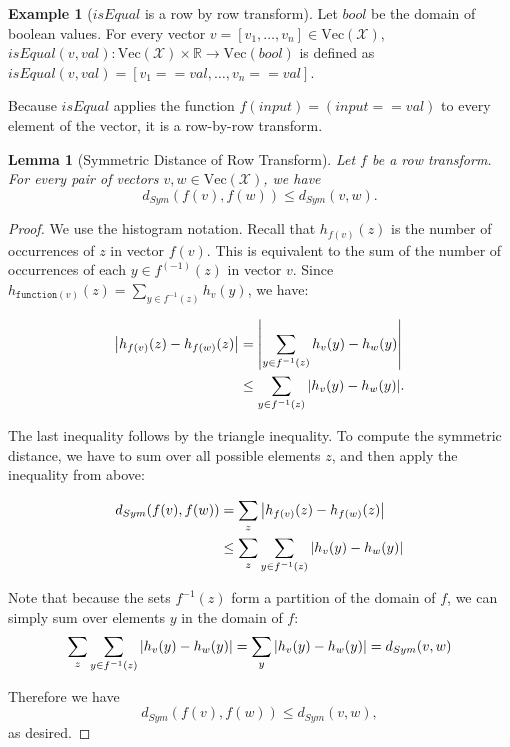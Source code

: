 \documentclass[11pt,a4paper]{article}
\newtheorem{lemma}[theorem]{Lemma}
\theoremstyle{definition}
\newtheorem{example}[theorem]{Example}
\newcommand{\Vect}{\mathrm{Vec}}
\begin{document}
\begin{example}[$isEqual$ is a row by row transform]
Let $bool$ be the domain of boolean values. For every vector $v = [v_1,\ldots,v_n]\in\Vect(\mathcal{X})$, $isEqual(v,val): \Vect(\mathcal{X})\times \mathbb{R} \rightarrow \Vect(bool)$ is defined as $isEqual(v,val) = [v_1 == val, \ldots, v_n == val]$.

Because $isEqual$ applies the function $f(input)  = (input == val)$ to every element of the vector, it is a row-by-row transform.
\end{example}

\begin{lemma}[Symmetric Distance of Row Transform]
Let $f$ be a row transform. For every pair of vectors $v, w\in \Vect(\mathcal{X})$, we have
$$d_{Sym}(f(v), f(w)) \leq d_{Sym}(v, w).$$
\end{lemma}

\begin{proof}
    We use the histogram notation. Recall that $h_{f(v)}(z)$ is the number of occurrences of $z$ in vector $f(v)$. This is equivalent to the sum of the number of occurrences of each $y \in f^{(-1)}(z)$ in vector $v$. Since $h_{\texttt{function}(v)}(z) = \sum_{y \in f^{-1}(z)} h_v(y)$, we have:

\begin{align*}
    \abs{h_{f(v)}(z) - h_{f(w)}(z)} &= \abs{\sum_{y \in f^{-1}(z)} h_v(y) - h_w(y)}\\
    &\leq \sum_{y \in f^{-1}(z)} \abs{h_v(y) - h_w(y)}.
\end{align*}

The last inequality follows by the triangle inequality. To compute the symmetric distance, we have to sum over all possible elements $z$, and then apply the inequality from above:

\begin{align*}
    d_{Sym}(f(v), f(w)) &= 
    \sum_z \abs{h_{f(v)}(z) - h_{f(w)}(z)} \\
    &\leq \sum_z \sum_{y \in f^{-1}(z)} \abs{h_v(y) - h_w(y)}\\
\end{align*}

Note that because the sets $f^{-1}(z)$ form a partition of the domain of $f$, we can simply sum over elements $y$ in the domain of $f$: $$\sum_z \sum_{y \in f^{-1}(z)} \abs{h_v(y) - h_w(y)} = \sum_y \abs{h_{v}(y) - h_{w}(y)} = d_{Sym}(v, w)$$

Therefore we have $$d_{Sym}(f(v), f(w)) \leq d_{Sym}(v, w),$$ as desired.
\end{proof}
\end{document}
